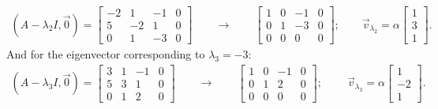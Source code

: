 \begin{eqnarray*}
  (A-\lambda_2 I,\vec{0})=\left[\begin{array}{ccc|c}-2&1&-1&0\\5&-2&1&0\\0&1&-3&0\end{array}\right]
	\qquad\rightarrow\qquad
	\left[\begin{array}{ccc|c}1&0&-1&0\\0&1&-3&0\\0&0&0&0\end{array}\right];\qquad
	\vec{v}_{\lambda_2}=\alpha\left[\begin{array}{c}1\\3\\1\end{array}\right].
\end{eqnarray*}
And for the eigenvector corresponding to $\lambda_3=-3$:
\begin{eqnarray*}
  (A-\lambda_3 I,\vec{0})=\left[\begin{array}{ccc|c}3&1&-1&0\\5&3&1&0\\0&1&2&0\end{array}\right]
	\qquad\rightarrow\qquad
	\left[\begin{array}{ccc|c}1&0&-1&0\\0&1&2&0\\0&0&0&0\end{array}\right];\qquad\
	\vec{v}_{\lambda_3}=\alpha\left[\begin{array}{c}1\\-2\\1\end{array}\right].
\end{eqnarray*}


